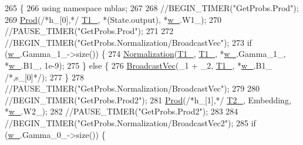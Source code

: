 \begin{DoxyCode}
265         \{
266           \textcolor{keyword}{using namespace }mblas;
267 
268           \textcolor{comment}{//BEGIN\_TIMER("GetProbs.Prod");}
269           \hyperlink{namespaceamunmt_1_1GPU_1_1mblas_a463b2de180e8ab66bae53d1f8c5bc011}{Prod}(\textcolor{comment}{/*h\_[0],*/} \hyperlink{classamunmt_1_1GPU_1_1Decoder_1_1Softmax_a8a139447e51633e488a436440b21ffe9}{T1\_}, *(State.output), *\hyperlink{classamunmt_1_1GPU_1_1Decoder_1_1Softmax_ae2e313f9d4f7b068c99ae73e97f91c41}{w\_}.W1\_);
270           \textcolor{comment}{//PAUSE\_TIMER("GetProbs.Prod");}
271 
272           \textcolor{comment}{//BEGIN\_TIMER("GetProbs.Normalization/BroadcastVec");}
273           \textcolor{keywordflow}{if} (\hyperlink{classamunmt_1_1GPU_1_1Decoder_1_1Softmax_ae2e313f9d4f7b068c99ae73e97f91c41}{w\_}.Gamma\_1\_->size()) \{
274             \hyperlink{namespaceamunmt_1_1GPU_1_1mblas_ae50f34596c0fcc0aa93e717edcd66379}{Normalization}(\hyperlink{classamunmt_1_1GPU_1_1Decoder_1_1Softmax_a8a139447e51633e488a436440b21ffe9}{T1\_}, \hyperlink{classamunmt_1_1GPU_1_1Decoder_1_1Softmax_a8a139447e51633e488a436440b21ffe9}{T1\_}, *\hyperlink{classamunmt_1_1GPU_1_1Decoder_1_1Softmax_ae2e313f9d4f7b068c99ae73e97f91c41}{w\_}.Gamma\_1\_, *\hyperlink{classamunmt_1_1GPU_1_1Decoder_1_1Softmax_ae2e313f9d4f7b068c99ae73e97f91c41}{w\_}.B1\_, 1e-9);
275           \} \textcolor{keywordflow}{else} \{
276             \hyperlink{namespaceamunmt_1_1GPU_1_1mblas_ace73de50c8241f219ad490d64513829f}{BroadcastVec}(\_1 + \_2, \hyperlink{classamunmt_1_1GPU_1_1Decoder_1_1Softmax_a8a139447e51633e488a436440b21ffe9}{T1\_}, *\hyperlink{classamunmt_1_1GPU_1_1Decoder_1_1Softmax_ae2e313f9d4f7b068c99ae73e97f91c41}{w\_}.B1\_ \textcolor{comment}{/*,s\_[0]*/});
277           \}
278           \textcolor{comment}{//PAUSE\_TIMER("GetProbs.Normalization/BroadcastVec");}
279 
280           \textcolor{comment}{//BEGIN\_TIMER("GetProbs.Prod2");}
281           \hyperlink{namespaceamunmt_1_1GPU_1_1mblas_a463b2de180e8ab66bae53d1f8c5bc011}{Prod}(\textcolor{comment}{/*h\_[1],*/} \hyperlink{classamunmt_1_1GPU_1_1Decoder_1_1Softmax_a81f4a316db17da624e59deaf9bf72951}{T2\_}, Embedding, *\hyperlink{classamunmt_1_1GPU_1_1Decoder_1_1Softmax_ae2e313f9d4f7b068c99ae73e97f91c41}{w\_}.W2\_);
282           \textcolor{comment}{//PAUSE\_TIMER("GetProbs.Prod2");}
283 
284           \textcolor{comment}{//BEGIN\_TIMER("GetProbs.Normalization/BroadcastVec2");}
285           \textcolor{keywordflow}{if} (\hyperlink{classamunmt_1_1GPU_1_1Decoder_1_1Softmax_ae2e313f9d4f7b068c99ae73e97f91c41}{w\_}.Gamma\_0\_->size()) \{

\end{DoxyCode}
